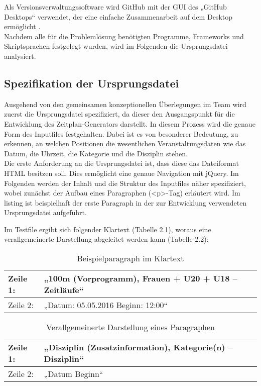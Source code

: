 Als Versionsverwaltungssoftware wird GitHub mit der \ac{GUI} des „GitHub Desktops“ verwendet, der eine einfache Zusammenarbeit auf dem Desktop ermöglicht \cite{github}.  \\
Nachdem alle für die Problemlösung benötigten Programme, Frameworks und Skriptsprachen festgelegt wurden, wird im Folgenden die Ursprungsdatei analysiert.

\subsection{Spezifikation der Ursprungsdatei}

Ausgehend von den gemeinsamen konzeptionellen Überlegungen im Team wird zuerst die Ursprungsdatei spezifiziert, da dieser den Ausgangspunkt für die Entwicklung des Zeitplan-Generators darstellt. In diesem Prozess wird die genaue Form des Inputfiles festgehalten. Dabei ist es von besonderer Bedeutung, zu erkennen, an welchen Positionen die wesentlichen Veranstaltungsdaten wie das Datum, die Uhrzeit, die Kategorie und die Disziplin stehen.\\
Die erste Anforderung an die Ursprungsdatei ist, dass diese das Dateiformat HTML besitzen soll. Dies ermöglicht eine genaue Navigation mit jQuery. Im Folgenden werden der Inhalt und die Struktur des Inputfiles näher spezifiziert, wobei zunächst der Aufbau eines Paragraphen (<p>-Tag) erläutert wird. Im listing ist beispielhaft der erste Paragraph in der zur Entwicklung verwendeten Ursprungsdatei aufgeführt. 
\lstset{language=html}

Im Testfile ergibt sich folgender Klartext (Tabelle 2.1), woraus eine verallgemeinerte Darstellung abgeleitet werden kann (Tabelle 2.2):\\
\begin{table}[h]
\caption{Beispielparagraph im Klartext}
\begin{tabular}{|l||l|}
\hline
Zeile 1: & „100m (Vorprogramm), Frauen + U20 + U18 – Zeitläufe“ \\
\hline
Zeile 2: & „Datum: 05.05.2016 Beginn: 12:00“ \\
\hline
\end{tabular}
\label{tab:Beispielparagraph im Klartext}
\end{table}
\begin{table}[h]
\caption{Verallgemeinerte Darstellung eines Paragraphen}
\begin{tabular}{|l||l|}
\hline
Zeile 1: & „Disziplin (Zusatzinformation), Kategorie(n) – Disziplin“ \\
\hline
Zeile 2: & „Datum Beginn“ \\
\hline
\end{tabular} 
\label{tab:Verallgemeinerte Darstellung eines Paragraphen}
\end{table}\\
